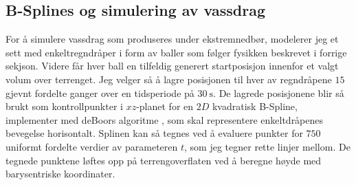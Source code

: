 \documentclass[norsk, doc, 11pt, a4paper]{apa7}  %
\begin{document}
\subsection{B-Splines og simulering av vassdrag}
For å simulere vassdrag som produseres under ekstremnedbør, modelerer jeg et sett med enkeltregndråper i form av baller som følger fysikken beskrevet i forrige sekjson. Videre får hver ball en tilfeldig generert startposisjon innenfor et valgt volum over terrenget. Jeg velger så å lagre posisjonen til hver av regndråpene \(15\) gjevnt fordelte ganger over en tidsperiode på \(\SI{30}{\second}\). De lagrede posisjonene blir så brukt som kontrollpunkter i \(xz\)-planet for en \(2D\) kvadratisk B-Spline, implementer med deBoors algoritme \parencite[ss.98-102]{nylundMAT301MatematikkIII2023}, som skal representere enkeltdråpenes bevegelse horisontalt. Splinen kan så tegnes ved å evaluere punkter for \(750\) uniformt fordelte verdier av parameteren \(t\), som jeg tegner rette linjer mellom. De tegnede punktene løftes opp på terrengoverflaten ved å beregne høyde med barysentriske koordinater.
\end{document}
